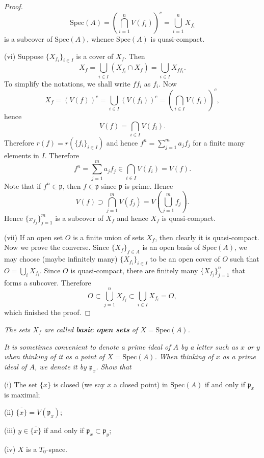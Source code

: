 \begin{proof}
$$
\mathrm{Spec}\left( A \right) =\left( \bigcap_{i=1}^n{V\left( f_i \right)} \right) ^c=\bigcup_{i=1}^n{X_{f_i}}
$$
is a subcover of $\mathrm{Spec}(A)$, whence $\mathrm{Spec}(A)$ is quasi-compact.\par
(vi) Suppose $\{X_{f_i}\}_{i\in I}$ is a cover of $X_f$. Then 
$$
X_f=\bigcup_{i\in I}{\left( X_{f_i}\cap X_f \right)}=\bigcup_{i\in I}{X_{ff_i}}.
$$
To simplify the notations, we shall write $ff_i$ as $f_i$. Now 
$$
X_f=\left( V\left( f \right) \right) ^c=\bigcup_{i\in I}{\left( V\left( f_i \right) \right) ^c}=\left( \bigcap_{i\in I}{V\left( f_i \right)} \right) ^c,
$$
hence 
$$
V\left( f \right) =\bigcap_{i\in I}{V\left( f_i \right)}.
$$
Therefore $r(f)=r(\{f_i\}_{i\in I})$ and hence $f^n=\sum_{j=1}^ma_jf_j$ for a finite many elements in $I$. Therefore 
$$
f^n=\sum_{j=1}^m{a_jf_j}\in \bigcap_{i\in I}{V\left( f_i \right)}=V\left( f \right) .
$$
Note that if $f^n\in\mathfrak{p}$, then $f\in\mathfrak{p}$ since $\mathfrak{p}$ is prime. Hence 
$$
V\left( f \right) \supset \bigcap_{j=1}^m{V\left( f_j \right)}=V\left( \bigcup_{j=1}^m{f_j} \right) .
$$
Hence $\{x_{f_j}\}_{j=1}^m$ is a subcover of $X_f$ and hence $X_f$ is quasi-compact.\par
(vii) If an open set $O$ is a finite union of sets $X_f$, then clearly it is quasi-compact. Now we prove the converse. Since $\{X_f\}_{f\in A}$ is an open basis of $\mathrm{Spec}(A)$, we may choose (maybe infinitely many) $\{X_{f_i}\}_{i\in I}$ to be an open cover of $O$ such that $O=\bigcup_iX_{f_i}$. Since $O$ is quasi-compact, there are finitely many $\{X_{f_j}\}_{j=1}^n$ that forms a subcover. Therefore 
$$
O\subset \bigcup_{j=1}^n{X_{f_j}}\subset \bigcup_{i\in I}{X_{f_i}}=O,
$$
which finished the proof.
\end{proof}
\begin{note}\em
The sets $X_f$ are called \textbf{basic open sets} of $X=\mathrm{Spec}(A)$.
\end{note}
\begin{problem}\em
It is sometimes convenient to denote a prime ideal of $A$ by a letter such as $x$ or $y$ when thinking of it as a point of $X=\mathrm{Spec}(A)$. When thinking of $x$ as a prime ideal of $A$, we denote it by $\mathfrak{p}_x$. Show that \par
(i) The set $\{x\}$ is closed (we say $x$ a closed point) in $\mathrm{Spec}(A)$ if and only if $\mathfrak{p}_x$ is maximal;\par
(ii) $\overline{\{x\}}=V(\mathfrak{p}_x)$;\par
(iii) $y\in\overline{\{x\}}$ if and only if $\mathfrak{p}_x\subset\mathfrak{p}_y$;\par
(iv) $X$ is a $T_0$-space.
\end{problem}
